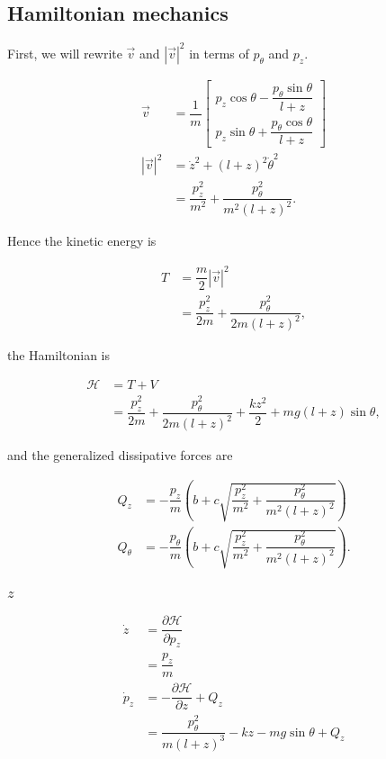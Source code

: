 \documentclass[12pt,a4paper,portrait]{article}
\newcommand{\ham}{\mathcal{H}}
\begin{document}
\subsection{Hamiltonian mechanics}
First, we will rewrite $\vec{v}$ and $|\vec{v}|^2$ in terms of $p_{\theta}$ and $p_z$. 

\begin{align*}
	\vec{v} &= \dfrac{1}{m}\begin{bmatrix}
		p_z\cos{\theta} - \dfrac{p_{\theta}\sin{\theta}}{l+z}\\
		p_z\sin{\theta} + \dfrac{p_{\theta}\cos{\theta}}{l+z}
	\end{bmatrix} \\
	|\vec{v}|^2 &= \dot{z}^2 + (l+z)^2 \dot{\theta}^2 \\
	&= \dfrac{p_z^2}{m^2} + \dfrac{p_{\theta}^2}{m^2(l+z)^2}.
\end{align*}

Hence the kinetic energy is

\begin{align*}
	T &= \dfrac{m}{2} |\vec{v}|^2 \\
	&= \dfrac{p_z^2}{2m} + \dfrac{p_{\theta}^2}{2m(l+z)^2},
\end{align*}

the Hamiltonian is

\begin{align*}
	\ham &= T + V\\
	&= \dfrac{p_z^2}{2m} + \dfrac{p_{\theta}^2}{2m(l+z)^2} + \dfrac{kz^2}{2} + mg(l+z)\sin{\theta},
\end{align*}

and the generalized dissipative forces are

\begin{align*}
	Q_z &= -\dfrac{p_z}{m}\left(b+c\sqrt{\dfrac{p_z^2}{m^2} + \dfrac{p_{\theta}^2}{m^2(l+z)^2}}\right) \\
	Q_{\theta} &= -\dfrac{p_{\theta}}{m} \left(b+c\sqrt{\dfrac{p_z^2}{m^2} + \dfrac{p_{\theta}^2}{m^2(l+z)^2}}\right).
\end{align*}

\subsubsection{$z$}
\begin{align*}
	\dot{z} &= \dfrac{\partial \ham}{\partial p_z} \\
	&= \dfrac{p_z}{m} \\
	\dot{p}_z &= -\dfrac{\partial \ham}{\partial z} + Q_z\\
	&= \dfrac{p_{\theta}^2}{m(l+z)^3} - kz - mg\sin{\theta} + Q_z
\end{align*}
\end{document}
